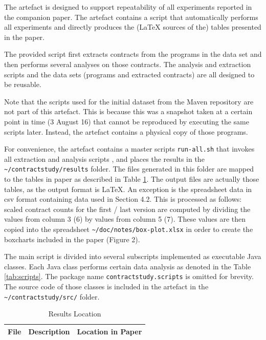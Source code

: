 \documentclass[a4paper,UKenglish]{darts}
\begin{document}
\begin{scope}
  The artefact is designed to support repeatability of all experiments reported in the 
  companion paper. The artefact contains a script that automatically performs all experiments and directly produces the (\LaTeX \hspace{1mm} sources of the) tables presented in the paper. 
  
  The provided script first extracts contracts from the programs in the data set and then performs several analyses on those contracts. The analysis and extraction scripts and the data sets (programs and extracted contracts) are all designed to be reusable. 
  
  Note that the scripts used for the initial dataset from the Maven repository are not part of this artefact. This is because this was a snapshot taken at a certain point in time (3 August 16) that cannot be reproduced by executing the same scripts later. Instead, the artefact contains a physical copy of those programs. 
  
  For convenience, the artefact contains a master scripts \texttt{run-all.sh} that invokes all extraction and analysis scripts , and places the results in the \texttt{\textasciitilde/contractstudy/results} folder. The files generated in this folder are mapped to the tables in paper as described in Table \ref{tab:results_location}. The output files are actually those tables, as the output format is \LaTeX. An exception is the spreadsheet data in csv format containing data used in Section 4.2. This is processed as follows: scaled contract counts for the first / last version are computed by dividing the values from column 3 (6) by values from column 5 (7). These values are then copied into the spreadsheet \texttt{\textasciitilde/doc/notes/box-plot.xlsx} in order to create the boxcharts included in the paper (Figure 2). 
  
  
  
  The main script is divided into several subscripts implemented as executable Java classes. Each Java class performs certain data analysis as denoted in the Table \ref{tab:scripts}. The package name \texttt{contractstudy.scripts} is omitted for brevity.  The source code of those classes is included in the artefact in the \texttt{\textasciitilde/contractstudy/src/} folder. 
  
  
    \begin{table}[t]
  	\centering
  	\caption{Results Location}
  	\label{tab:results_location}
  	\begin{tabular}{p{5cm} p{4cm} p{4cm} } \hline
  		File & Description & Location in Paper \\ \hline
  		

\end{tabular}
\end{table}
\end{scope}
\end{document}
